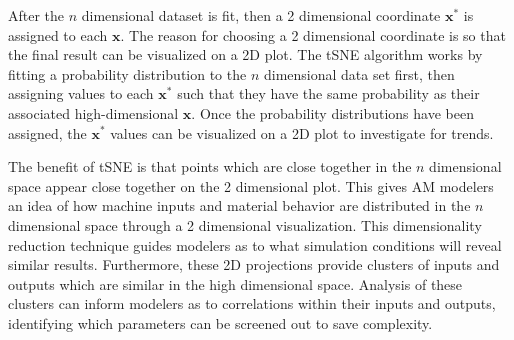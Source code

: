  After the $n$ dimensional dataset is fit, then a 2 dimensional coordinate $\mathbf{x}^*$ is assigned to each $\mathbf{x}$. The reason for choosing a 2 dimensional coordinate is so that the final result can be visualized on a 2D plot. The tSNE algorithm works by fitting a probability distribution to the $n$ dimensional data set first, then assigning values to each $\mathbf{x}^*$ such that they have the same probability as their associated high-dimensional $\mathbf{x}$. Once the probability distributions have been assigned, the $\mathbf{x}^*$ values can be visualized on a 2D plot to investigate for trends.

The benefit of tSNE is that points which are close together in the $n$ dimensional space appear close together on the 2 dimensional plot. This gives AM modelers an idea of how machine inputs and material behavior are distributed in the $n$ dimensional space through a 2 dimensional visualization. This dimensionality reduction technique guides modelers as to what simulation conditions will reveal similar results. Furthermore, these 2D projections provide clusters of inputs and outputs which are similar in the high dimensional space. Analysis of these clusters can inform modelers as to correlations within their inputs and outputs, identifying which parameters can be screened out to save complexity.


